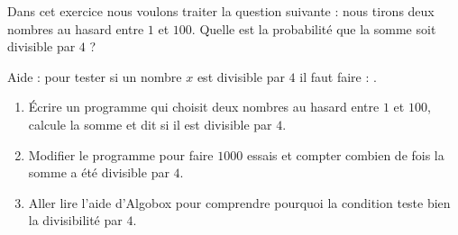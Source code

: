 
\begin{exercice}\label{exosmath-0581}

    Dans cet exercice nous voulons traiter la question suivante : nous tirons deux nombres au hasard entre \( 1\) et \( 100\). Quelle est la probabilité que la somme soit divisible par \( 4\) ?

    Aide : pour tester si un nombre \( x\) est divisible par \( 4\) il faut faire : .

    \begin{enumerate}
        \item
            Écrire un programme qui choisit deux nombres au hasard entre \( 1\) et \( 100\), calcule la somme et dit si il est divisible par \( 4\).
        \item
            Modifier le programme pour faire \( 1000\) essais et compter combien de fois la somme a été divisible par \( 4\).
        \item
            Aller lire l'aide d'Algobox pour comprendre pourquoi la condition  teste bien la divisibilité par \( 4\).
    \end{enumerate}

\end{exercice}
